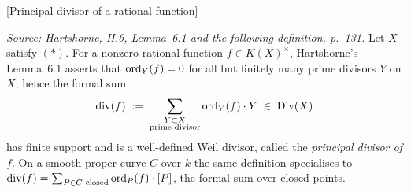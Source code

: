 \begin{definition}
\leanok
[Principal divisor of a rational function]
  \label{def:principal_divisor}
  
  \textit{Source: Hartshorne, II.6, Lemma~6.1 and the following definition,
  p.~131.}
  Let \(X\) satisfy \((*)\). For a nonzero rational function \(f \in K(X)^{\times}\),
  Hartshorne's Lemma~6.1 asserts that \(\operatorname{ord}_Y(f) = 0\) for all but finitely
  many prime divisors \(Y\) on \(X\); hence the formal sum
  \[
    \mathrm{div}(f) \;:=\; \sum_{\substack{Y \subset X \\ \text{prime divisor}}}
    \operatorname{ord}_Y(f) \cdot Y \;\in\; \mathrm{Div}(X)
  \]
  has finite support and is a well-defined Weil divisor, called the
  \emph{principal divisor of \(f\)}. On a smooth proper curve \(C\) over \(\bar k\)
  the same definition specialises to
  \(\mathrm{div}(f) = \sum_{P \in C \text{ closed}} \operatorname{ord}_P(f) \cdot [P]\), the formal
  sum over closed points.
\end{definition}
